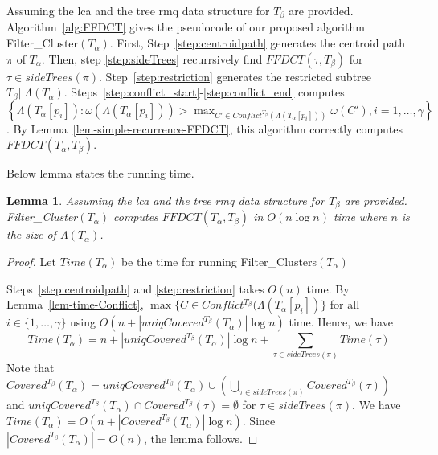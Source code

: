 \documentclass[final,1p,times]{elsarticle}
\newcommand{\weight}{\omega}
\newcommand{\TA}{T_\alpha}
\newcommand{\TB}{T_\beta}
\newtheorem{lemma}[theorem]{Lemma}
\begin{document}
	    Assuming the lca and the tree rmq data structure for $\TB$ are provided.
    Algorithm~\ref{alg:FFDCT} gives the pseudocode of our proposed algorithm Filter\_Cluster$(\TA)$. First, Step~\ref{step:centroidpath} generates the centroid path $\pi$ of $\TA$.
    Then, step \ref{step:sideTrees} recurrsively find $FFDCT(\tau, \TB)$ for $\tau \in sideTrees(\pi)$.
	    Step~\ref{step:restriction} generates the restricted subtree $\TB||\Lambda(\TA)$.
    Steps~\ref{step:conflict_start}-\ref{step:conflict_end} computes
		 $\left\{ \Lambda(\TA[p_i]) : \weight(\Lambda(\TA[p_i])) > \max_{C' \in Conflict^{\TB}(\Lambda(\TA[p_i]))} \weight(C'), i=1,\ldots, \gamma \right\}$.
	    	By Lemma~\ref{lem-simple-recurrence-FFDCT}, this algorithm correctly computes $FFDCT(\TA, \TB)$.

    Below lemma states the running time.
    \begin{lemma}
	    Assuming the lca and the tree rmq data structure for $\TB$ are provided.
	    Filter\_Cluster$(\TA)$ computes $FFDCT(\TA, \TB)$ in $O(n \log n)$ time where $n$ is the size of $\Lambda(\TA)$.
    \end{lemma}
    \begin{proof}
	    Let $Time(\TA)$ be the time for running Filter\_Clusters$(\TA)$

	    Steps~\ref{step:centroidpath} and \ref{step:restriction} takes $O(n)$ time.
	    By Lemma~\ref{lem-time-Conflict}, 
	    $\max \{ C \in Conflict^{\TB}(\Lambda(\TA[p_i]) \}$ for all $i \in \{1, \ldots, \gamma\}$ 
	    using $O\left(n + |uniqCovered^{\TB}(\TA)| \log n \right)$ time.
	    Hence, we have
	    \[ Time(\TA) = n + |uniqCovered^{\TB}(\TA)| \log n + \sum_{\tau \in sideTrees(\pi)} Time(\tau) \]
	    Note that $Covered^{\TB}(\TA) = uniqCovered^{\TB}(\TA) \cup \left( \bigcup_{\tau \in sideTrees(\pi)} Covered^{\TB}(\tau) \right)$ and $uniqCovered^{\TB}(\TA) \cap Covered^{\TB}(\tau) = \emptyset$ for $\tau \in sideTrees(\pi)$.
	    We have $Time(\TA) = O(n + |Covered^{\TB}(\TA)| \log n)$.
	    Since $|Covered^{\TB}(\TA)| = O(n)$, the lemma follows.
    \end{proof}
\end{document}
